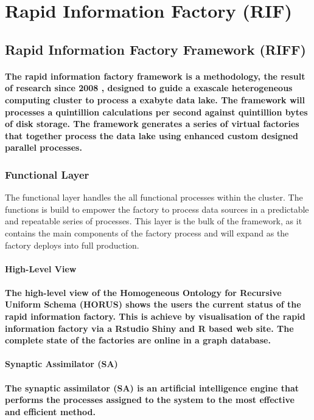 \documentclass{acm_proc_article-sp}
\begin{document}
\section{Rapid Information Factory (RIF)}
\subsection{Rapid Information Factory Framework (RIFF)}
\paragraph{The rapid information factory framework is a methodology, the result of research since 2008 , designed to guide a exascale \cite{bergman2008exascale} heterogeneous computing cluster to process a exabyte data lake. The framework will processes a quintillion calculations per second against quintillion bytes of disk storage. The framework generates a series of virtual factories that together process the data lake using enhanced custom designed parallel processes.}
\subsubsection{Functional Layer}
The functional layer handles the all functional processes within the cluster.
The functions is build to empower the factory to process data sources in a predictable and repeatable series of processes.
This layer is the bulk of the framework, as it contains the main components of the factory process and will expand as the factory deploys into full production.
\paragraph{\textbf{High-Level View}}
\paragraph{The high-level view of the Homogeneous Ontology for Recursive Uniform Schema (HORUS) shows the users the current status of the rapid information factory. This is achieve by visualisation of the rapid information factory via a Rstudio Shiny \cite{ortega2013combining} and R \cite{team2000r} based web site. The complete state of the factories are online in a graph database.}
\paragraph{\textbf{Synaptic Assimilator (SA)}}
\paragraph{The synaptic assimilator (SA) is an artificial intelligence \cite{o2013artificial} engine that performs the processes assigned to the system to the most effective and efficient method.}
\end{document}
